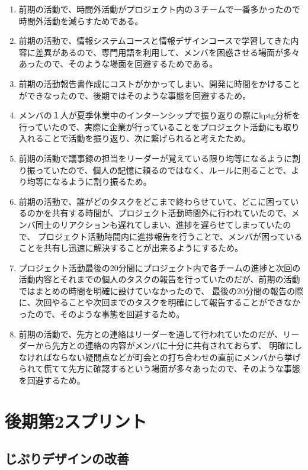 \begin{enumerate}
    \item 前期の活動で、時間外活動がプロジェクト内の３チームで一番多かったので時間外活動を減らすためである。
    \item 前期の活動で、情報システムコースと情報デザインコースで学習してきた内容に差異があるので、専門用語を利用して、メンバを困惑させる場面が多々あったので、そのような場面を回避するためである。
    \item 前期の活動報告書作成にコストがかかってしまい、開発に時間をかけることができなったので、後期ではそのような事態を回避するため。
    \item メンバの１人が夏季休業中のインターンシップで振り返りの際にkptg分析を行っていたので、実際に企業が行っていることをプロジェクト活動にも取り入れることで活動を振り返り、次に繋げられると考えたため。
    \item 前期の活動で議事録の担当をリーダーが覚えている限り均等になるように割り振っていたので、個人の記憶に頼るのではなく、ルールに則ることで、より均等になるように割り振るため。
    \item 前期の活動で、誰がどのタスクをどこまで終わらせていて、どこに困っているのかを共有する時間が、プロジェクト活動時間外に行われていたので、メンバ同士のリアクションも遅れてしまい、進捗を遅らせてしまっていたので、
          プロジェクト活動時間内に進捗報告を行うことで、メンバが困っていることを共有し迅速に解決することが出来るようにするため。
    \item プロジェクト活動最後の20分間にプロジェクト内で各チームの進捗と次回の活動内容とそれまでの個人のタスクの報告を行っていたのだが、前期の活動ではまとめの時間を明確に設けていなかったので、
          最後の20分間の報告の際に、次回やることや次回までのタスクを明確にして報告することができなかったので、そのような事態を回避するため。
    \item 前期の活動で、先方との連絡はリーダーを通して行われていたのだが、リーダーから先方との連絡の内容がメンバに十分に共有されておらず、
          明確にしなければならない疑問点などが町会との打ち合わせの直前にメンバから挙げられて慌てて先方に確認するという場面が多々あったので、そのような事態を回避するため。
\end{enumerate}




\section{後期第2スプリント}
\subsection{じぷりデザインの改善}
